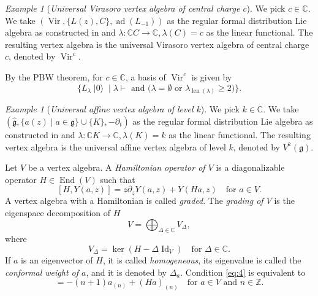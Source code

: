 \documentclass[a4paper, 12pt, reqno]{amsart}
\theoremstyle{remark}
\newtheorem{example}[theorem]{Example}
\DeclareMathOperator{\Vir}{Vir}
\DeclareMathOperator{\len}{len}
\DeclareMathOperator{\vac}{|0\rangle}
\DeclareMathOperator{\ad}{ad}
\DeclareMathOperator{\End}{End}
\DeclareMathOperator{\Id}{Id}
\begin{document}
\begin{example}[\emph{Universal Virasoro vertex algebra of central charge $c$}]
  \label{exa:11}
  We pick $c \in \mathbb{C}$.
  We take $(\Vir, \{L(z), C\}, \ad(L_{-1}))$ as the regular formal distribution Lie algebra as constructed in  and $\lambda: \mathbb{C}C \to \mathbb{C}, \lambda(C) = c$ as the linear functional.
  The resulting vertex algebra is the universal Virasoro vertex algebra of central charge $c$, denoted by $\Vir^c$.

  By the PBW theorem, for $c \in \mathbb{C}$, a basis of $\Vir^c$ is given by
  \begin{equation*}
    \{L_{\lambda}\vac \mid \text{$\lambda \vdash$ and ($\lambda = \emptyset$ or $\lambda_{\len(\lambda)} \ge 2$)}\}.
  \end{equation*}
\end{example}

\begin{example}[\emph{Universal affine vertex algebra of level $k$}]
  \label{exa:12}
  We pick $k \in \mathbb{C}$.
  We take $(\hat{\mathfrak{g}}, \{a(z) \mid a \in \mathfrak{g}\} \cup \{K\}, -\partial_t)$ as the regular formal distribution Lie algebra as constructed in  and $\lambda: \mathbb{C}K \to \mathbb{C}, \lambda(K) = k$ as the linear functional.
  The resulting vertex algebra is the universal affine vertex algebra of level $k$, denoted by $V^k(\mathfrak{g})$.
\end{example}

Let $V$ be a vertex algebra.
A \emph{Hamiltonian operator of $V$} is a diagonalizable operator $H \in \End(V)$ such that
\begin{equation}
  \label{eq:4}
  [H, Y(a, z)] = z\partial_zY(a, z) + Y(Ha, z) \quad \text{for $a \in V$}.
\end{equation}
A vertex algebra with a Hamiltonian is called \emph{graded}.
The \emph{grading of $V$} is the eigenspace decomposition of $H$
\begin{equation*}
  V = \bigoplus_{\Delta \in \mathbb{C}}V_{\Delta},
\end{equation*}
where
\begin{equation*}
  V_{\Delta} = \ker(H - \Delta\Id_V) \quad \text{for $\Delta \in \mathbb{C}$}.
\end{equation*}
If $a$ is an eigenvector of $H$, it is called \emph{homogeneous}, its eigenvalue is called the \emph{conformal weight of $a$}, and it is denoted by $\Delta_a$.
Condition \eqref{eq:4} is equivalent to
\begin{equation*}
  [H, a_{(n)}] = -(n + 1)a_{(n)} + (Ha)_{(n)} \quad \text{for $a \in V$ and $n \in \mathbb{Z}$}.
\end{equation*}
\end{document}
